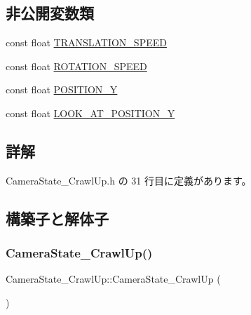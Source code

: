 \subsection*{非公開変数類}
\begin{DoxyCompactItemize}
\item 
const float \mbox{\hyperlink{class_camera_state___crawl_up_a7db98276f51f2ff481d491a69840aee9}{T\+R\+A\+N\+S\+L\+A\+T\+I\+O\+N\+\_\+\+S\+P\+E\+ED}}
\item 
const float \mbox{\hyperlink{class_camera_state___crawl_up_af1e1ad90d163cbf9c3abfe9ee21470ed}{R\+O\+T\+A\+T\+I\+O\+N\+\_\+\+S\+P\+E\+ED}}
\item 
const float \mbox{\hyperlink{class_camera_state___crawl_up_ac2e1ac195bd2fcb6b5af30879f989b28}{P\+O\+S\+I\+T\+I\+O\+N\+\_\+Y}}
\item 
const float \mbox{\hyperlink{class_camera_state___crawl_up_ab9d36979fa5a6cfb5033f92632ee5d19}{L\+O\+O\+K\+\_\+\+A\+T\+\_\+\+P\+O\+S\+I\+T\+I\+O\+N\+\_\+Y}}
\end{DoxyCompactItemize}


\subsection{詳解}


 Camera\+State\+\_\+\+Crawl\+Up.\+h の 31 行目に定義があります。



\subsection{構築子と解体子}
\mbox{\label{class_camera_state___crawl_up_a75741967576f6f544007ad8ccc574202}} 
\subsubsection{\texorpdfstring{Camera\+State\+\_\+\+Crawl\+Up()}{CameraState\_CrawlUp()}}
{\footnotesize\ttfamily Camera\+State\+\_\+\+Crawl\+Up\+::\+Camera\+State\+\_\+\+Crawl\+Up (\begin{DoxyParamCaption}{ }\end{DoxyParamCaption})}



